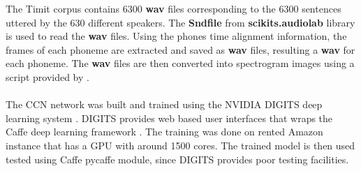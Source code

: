 The Timit corpus contains 6300 \textbf{wav} files corresponding to the 6300 sentences uttered by the 630 different speakers. The \textbf{Sndfile} from \textbf{scikits.audiolab} library is used to read the \textbf{wav} files. Using the phones time alignment information, the frames of each phoneme are extracted and saved as \textbf{wav} files, resulting a \textbf{wav} for each phoneme. The \textbf{wav} files are then converted into spectrogram images using a script provided by \cite{pannous}.\\\\
The CCN network was built and trained using the NVIDIA DIGITS deep learning system \cite{digits}. DIGITS provides web based user interfaces that wraps the Caffe deep learning framework \cite{caffe}. The training was done on rented Amazon instance that has a GPU with around 1500 cores. The trained model is then used tested using Caffe pycaffe module, since DIGITS provides poor testing facilities.
